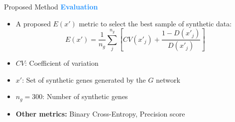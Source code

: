 \begin{frame}{Proposed Method}
    \Large\textcolor{dodgerblue}{\textbf{Evaluation}}
    \normalsize
    \vspace{7pt}
    \begin{itemize}
        \item A proposed $E(x')$ metric to select the best sample of synthetic data:
        \vspace{8pt}
        \Large
        \begin{equation*}
            E(x') = \frac{1}{n_{g}}\sum_{j}^{n_{g}}\left[CV({x'}_{j}) + \frac{1-D({x'}_{j})}{D({x'}_{j})}\right]
        \end{equation*}
        \normalsize
        \vspace{4pt}
        \item $CV$: Coefficient of variation
        \vspace{1pt}
        \item $x'$: Set of synthetic genes generated by the $G$ network
        \vspace{1pt}
        \item $n_g=300$: Number of synthetic genes
        \vspace{1pt}
        \item \textbf{Other metrics:} Binary Cross-Entropy, Precision score
    \end{itemize}
\end{frame}

